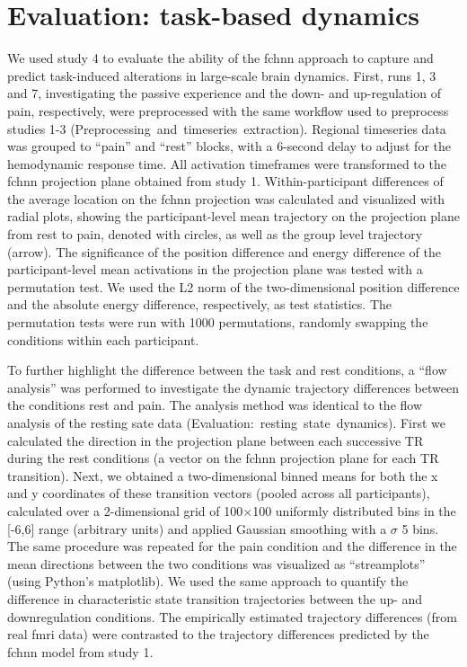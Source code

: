 \documentclass{article}
\begin{document}
\section{Evaluation: task-based dynamics}

We used study 4 to evaluate the ability of the \acrshort{fchnn} approach to capture and predict task-induced alterations in large-scale brain dynamics.
First, runs 1, 3 and 7, investigating the passive experience and the down- and up-regulation of pain, respectively, were preprocessed with the same workflow used to preprocess studies 1-3 (Preprocessing~and~timeseries~extraction). Regional timeseries data was grouped to ``pain'' and ``rest'' blocks, with a 6-second delay to adjust for the hemodynamic response time. All activation timeframes were transformed to the \acrshort{fchnn} projection plane obtained from study 1. Within-participant differences of the average location on the \acrshort{fchnn} projection was calculated and visualized with radial plots, showing the participant-level mean trajectory on the projection plane from rest to pain, denoted with circles, as well as the group level trajectory (arrow). The significance of the position difference and energy difference of the participant-level mean activations in the projection plane was tested with a permutation test. We used the L2 norm of the two-dimensional position difference and the absolute energy difference, respectively, as test statistics. The permutation tests were run with 1000 permutations, randomly swapping the conditions within each participant.

To further highlight the difference between the task and rest conditions, a ``flow analysis'' was performed to investigate the dynamic trajectory differences between the conditions rest and pain. The analysis method was identical to the flow analysis of the resting sate data (Evaluation:~resting~state~dynamics). First we calculated the direction in the projection plane between each successive TR during the rest conditions (a vector on the \acrshort{fchnn} projection plane for each TR transition). Next, we obtained a two-dimensional binned means for both the x and y coordinates of these transition vectors (pooled across all participants), calculated over a 2-dimensional grid of 100$\times$100 uniformly distributed bins in the [-6,6] range (arbitrary units) and applied Gaussian smoothing with a $\sigma$ 5 bins.
The same procedure was repeated for the pain condition and the difference in the mean directions between the two conditions was visualized as ``streamplots'' (using Python's matplotlib). We used the same approach to quantify the difference in characteristic state transition trajectories between the up- and downregulation conditions. The empirically estimated trajectory differences (from real \acrshort{fmri} data) were contrasted to the trajectory differences predicted by the \acrshort{fchnn} model from study 1.
\end{document}
